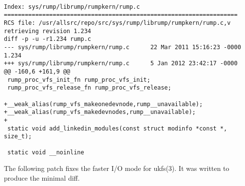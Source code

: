 {\tt \scriptsize
\begin{verbatim}
Index: sys/rump/librump/rumpkern/rump.c
===================================================================
RCS file: /usr/allsrc/repo/src/sys/rump/librump/rumpkern/rump.c,v
retrieving revision 1.234
diff -p -u -r1.234 rump.c
--- sys/rump/librump/rumpkern/rump.c      22 Mar 2011 15:16:23 -0000      1.234
+++ sys/rump/librump/rumpkern/rump.c      5 Jan 2012 23:42:17 -0000
@@ -160,6 +161,9 @@
 rump_proc_vfs_init_fn rump_proc_vfs_init;
 rump_proc_vfs_release_fn rump_proc_vfs_release;
 
+__weak_alias(rump_vfs_makeonedevnode,rump__unavailable);
+__weak_alias(rump_vfs_makedevnodes,rump__unavailable);
+
 static void add_linkedin_modules(const struct modinfo *const *, size_t);
 
 static void __noinline
\end{verbatim}}

The following patch fixes the faster I/O mode for ukfs(3).  It was
written to produce the minimal diff.

